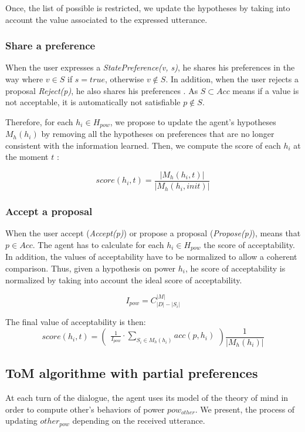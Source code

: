 \documentclass[sigconf]{aamas}  %
\begin{document}
	Once, the list of possible is restricted, we update the hypotheses by taking into account the value associated to the expressed utterance.
	
	\subsubsection{Share a preference}
	When the user expresses a \emph{StatePreference(v, s)}, he shares his preferences in the way where $v \in S$ if $s =true$, otherwise $v \notin S$. 
	In addition, when the user rejects a proposal \emph{Reject(p)}, he also shares his preferences . As $S \subset Acc$ means if a value is not acceptable, it is automatically not satisfiable $p \notin S$. 
	
	Therefore, for each  $h_i \in H_{pow}$, we propose to update the agent's hypotheses $M_h(h_i)$ by removing all the hypotheses on preferences that are no longer consistent with the information learned. 
	Then, we compute the score of each $h_i$ at the moment $t$ :
	
	$$score(h_i,t) = \frac{|M_h(h_i, t)|}{|M_h(h_i, init)|}$$

		
	\subsubsection{Accept a proposal}
	When the user accept (\emph{Accept(p)}) or propose a proposal (\emph{Propose(p)}), means that $p \in Acc$. 
	The agent has to calculate for each $h_i \in H_{pow}$ the score of acceptability. In addition, the values of acceptability have to be normalized to allow a coherent comparison. Thus, given a hypothesis on power $h_i$, he score of acceptability is normalized by taking into account the ideal score of acceptability.
	
	$$I_{pow} =  C_{|D|-|S_i|}^{|M|}$$
	
	
	The final value of acceptability is then:
	\begin{equation}
	score(h_i, t)= \left( \begin{array}{c}  \frac{1}{I_{pow}} \cdot \sum_{S_i \in M_h(h_i) } acc(p, h_i) 
	\end{array}\right) \frac{1}{| M_h(h_i)|}
	\end{equation}

	\subsection{ToM algorithme with partial preferences}
	At each turn of the dialogue, the agent uses its model of the theory of mind in order to compute other's behaviors of power $pow_{other}$. We present, the process of updating $other_{pow}$ depending on the received utterance. 
		
\end{document}
